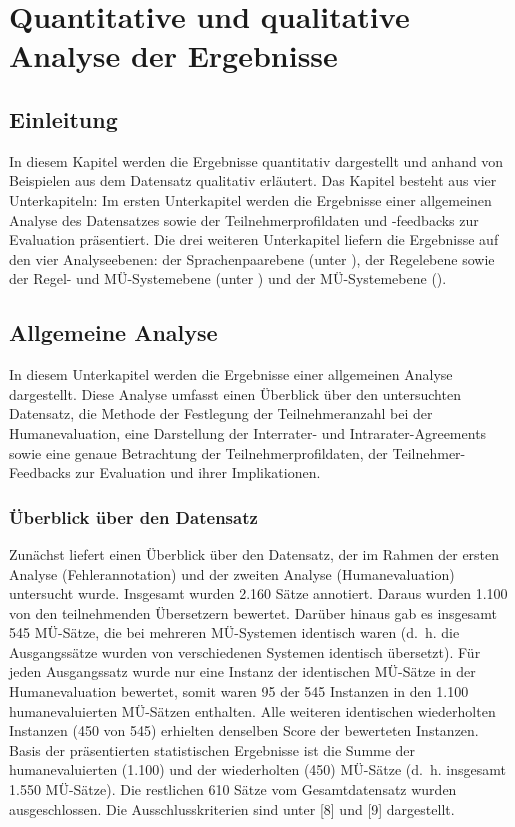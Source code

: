 \chapter{\label{ch:5}Quantitative und qualitative Analyse der Ergebnisse}


\section{\label{sec:5.0}Einleitung}

In diesem Kapitel werden die Ergebnisse quantitativ dargestellt und anhand von Beispielen aus dem Datensatz qualitativ erläutert. Das Kapitel besteht aus vier Unterkapiteln: Im ersten Unterkapitel werden die Ergebnisse einer allgemeinen Analyse des Datensatzes sowie der Teilnehmerprofildaten und \nobreakdash-feedbacks zur Evaluation präsentiert. Die drei weiteren Unterkapitel liefern die Ergebnisse auf den vier Analyseebenen: der Sprachenpaarebene (unter ), der Regelebene sowie der Regel- und MÜ-Systemebene (unter ) und der MÜ-Systemebene ().

\section{\label{sec:5.1}Allgemeine Analyse}

In diesem Unterkapitel werden die Ergebnisse einer allgemeinen Analyse dargestellt. Diese Analyse umfasst einen Überblick über den untersuchten Datensatz, die Methode der Festlegung der Teilnehmeranzahl bei der Humanevaluation, eine Darstellung der Interrater- und Intrarater-Agreements sowie eine genaue Betrachtung der Teilnehmerprofildaten, der Teilnehmer-Feedbacks zur Evaluation und ihrer Implikationen.

\subsection{Überblick über den Datensatz}
\label{sec:5.1.0}
Zunächst liefert  einen Überblick über den Datensatz, der im Rahmen der ersten Analyse (Fehlerannotation) und der zweiten Analyse (Humanevaluation) untersucht wurde. Insgesamt wurden 2.160 Sätze annotiert. Daraus wurden 1.100 von den teilnehmenden Übersetzern bewertet. Darüber hinaus gab es insgesamt 545 MÜ-Sätze, die bei mehreren MÜ-Systemen identisch waren (d.~h. die Ausgangssätze wurden von verschiedenen Systemen identisch übersetzt). Für jeden Ausgangssatz wurde nur eine Instanz der identischen MÜ-Sätze in der Humanevaluation bewertet, somit waren 95 der 545 Instanzen in den 1.100 humanevaluierten MÜ-Sätzen enthalten. Alle weiteren identischen wiederholten Instanzen (450 von 545) erhielten denselben Score der bewerteten Instanzen. Basis der präsentierten statistischen Ergebnisse ist die Summe der humanevaluierten (1.100) und der wiederholten (450) MÜ-Sätze (d.~h. insgesamt 1.550 MÜ-Sätze). Die restlichen 610 Sätze vom Gesamtdatensatz wurden ausgeschlossen. Die Ausschlusskriterien sind unter  [8] und [9] dargestellt.


